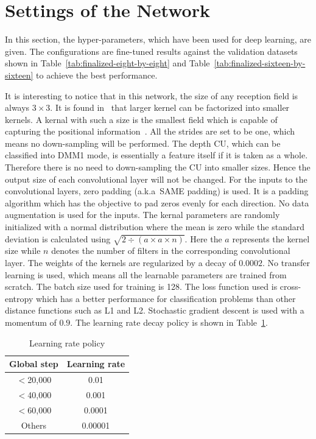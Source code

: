 \section{Settings of the Network}\label{sec:config}
In this section, the hyper-parameters, which have been
used for deep learning, are given.
The configurations are fine-tuned results against the validation
datasets shown in Table~\ref{tab:finalized-eight-by-eight}
and Table~\ref{tab:finalized-sixteen-by-sixteen} to achieve the
best performance.

It is interesting to notice that in this network, 
the size of any reception field
is always \(3\times3\).
It is found in~\parencite{RN62} that
larger kernel can be factorized into smaller kernels.
A kernal with such a size is the smallest
field which is capable of capturing the positional
information~\parencite{RN107}.
All the strides are set to be one, which means
no down-sampling will be performed.
The depth CU,
which can be classified into DMM1 mode, is essentially
a feature itself if it is taken as a whole.
Therefore there is no need to down-sampling
the CU into smaller sizes.
Hence the output size of each convolutional layer
will not be changed.
For the inputs to the convolutional layers, 
zero padding (a.k.a\ SAME padding) is used.
It is a padding algorithm which has the objective
to pad zeros evenly for each direction.
No data augmentation is used for the inputs.
The kernal parameters are randomly initialized 
with a normal distribution where the mean 
is zero while the standard deviation is 
calculated using 
\(\sqrt{2\div(\mathit{a}\times\mathit{a}\times\mathit{n})}\).
Here the \(\mathit{a}\) represents the kernel size
while \(\mathit{n}\) denotes the number of filters
in the corresponding convolutional layer.
The weights of the kernels are regularized by
a decay of \(0.0002\).
No transfer learning is used, which means all the learnable 
parameters are trained from scratch.
The batch size used for training is 128.
The loss function used is cross-entropy which has
a better performance for classification problems 
than other distance functions such as L1 and L2.
Stochastic gradient descent is used with a momentum 
of \(0.9\).
The learning rate decay policy is shown in 
Table~\ref{tab:lr-policy}.

\begin{table}[H]
    \caption{Learning rate policy}
    \bigskip\label{tab:lr-policy}
    \centering
    \begin{tabular}{c c}
        \toprule
        Global step & Learning rate \\
        \midrule
        \(<\)20,000 & 0.01 \\
        \(<\)40,000 & 0.001 \\
        \(<\)60,000 & 0.0001 \\
        Others  & 0.00001 \\
        \bottomrule
    \end{tabular}
\end{table}

